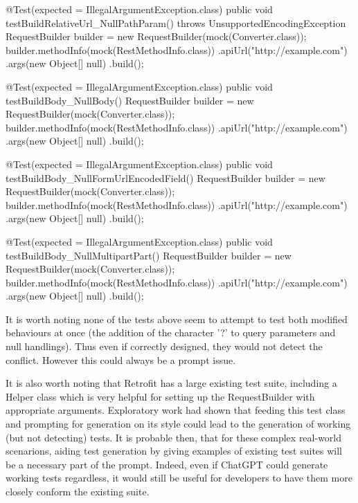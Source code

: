 \begin{response}
@Test(expected = IllegalArgumentException.class)
public void testBuildRelativeUrl_NullPathParam() throws UnsupportedEncodingException {
    RequestBuilder builder = new RequestBuilder(mock(Converter.class));
    builder.methodInfo(mock(RestMethodInfo.class))
           .apiUrl("http://example.com")
           .args(new Object[] {null})
           .build();
}

@Test(expected = IllegalArgumentException.class)
public void testBuildBody_NullBody() {
    RequestBuilder builder = new RequestBuilder(mock(Converter.class));
    builder.methodInfo(mock(RestMethodInfo.class))
           .apiUrl("http://example.com")
           .args(new Object[] {null})
           .build();
}

@Test(expected = IllegalArgumentException.class)
public void testBuildBody_NullFormUrlEncodedField() {
    RequestBuilder builder = new RequestBuilder(mock(Converter.class));
    builder.methodInfo(mock(RestMethodInfo.class))
           .apiUrl("http://example.com")
           .args(new Object[] {null})
           .build();
}

@Test(expected = IllegalArgumentException.class)
public void testBuildBody_NullMultipartPart() {
    RequestBuilder builder = new RequestBuilder(mock(Converter.class));
    builder.methodInfo(mock(RestMethodInfo.class))
           .apiUrl("http://example.com")
           .args(new Object[] {null})
           .build();
}
\end{response}
It is worth noting none of the tests above seem to attempt to test both modified behaviours at once (the addition of the character '?' to query parameters and null handlings). Thus even if correctly designed, they would not detect the conflict.
However this could always be a prompt issue.

It is also worth noting that Retrofit has a large existing test suite, including a Helper class which is very helpful for setting up the RequestBuilder with appropriate arguments.
Exploratory work had shown that feeding this test class and prompting for generation on its style could lead to the generation of working (but not detecting) tests. It is probable then,
that for these complex real-world scenarions, aiding test generation by giving examples of existing test suites will be a necessary part of the prompt. Indeed, even if ChatGPT could generate
working tests regardless, it would still be useful for developers to have them more closely conform the existing suite.

